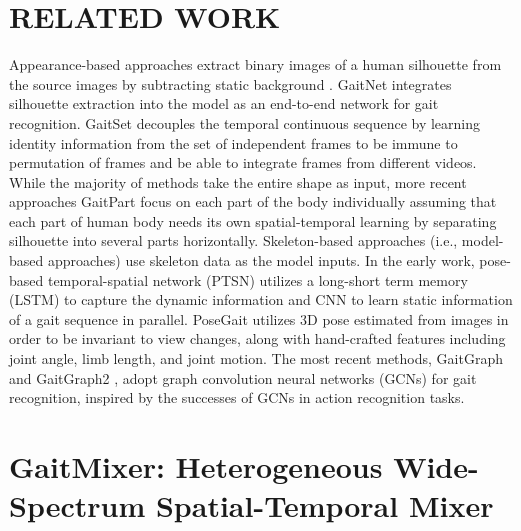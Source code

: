 \documentclass{article}
\begin{document}
\section{RELATED WORK}
\label{sec:related_work}



Appearance-based approaches extract binary images of a human silhouette from the source images by subtracting static background \cite{Silhouette_analysis_based}. GaitNet \cite{GaitNet} integrates silhouette extraction into the model as an end-to-end network for gait recognition. GaitSet \cite{GaitSet} decouples the temporal continuous sequence by learning identity information from the set of independent frames to be immune to permutation of frames and be able to integrate frames from different videos. While the majority of methods \cite{GaitNet}\cite{GaitSet}\cite{cross_view_cnn_silhouette} take the entire shape as input, more recent approaches GaitPart \cite{GaitPart} focus on each part of the body individually assuming that each part of human body needs its own spatial-temporal learning by separating silhouette into several parts horizontally. Skeleton-based approaches (i.e., model-based approaches) use skeleton data as the model inputs. In the early work, pose-based temporal-spatial network (PTSN) \cite{PTSN} utilizes a long-short term memory (LSTM) to capture the dynamic information and CNN to learn static information of a gait sequence in parallel. PoseGait \cite{PoseGait} utilizes 3D pose estimated from images in order to be invariant to view changes, along with hand-crafted features including joint angle, limb length, and joint motion. The most recent methods, GaitGraph \cite{GaitGraph} and GaitGraph2 \cite{GaitGraph2}, adopt graph convolution neural networks (GCNs) for gait recognition, inspired by the successes of GCNs in action recognition tasks.



\section{GaitMixer: Heterogeneous Wide-Spectrum Spatial-Temporal Mixer}\label{sec:method}
\end{document}
